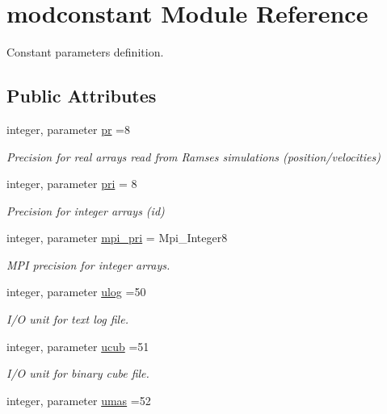 \hypertarget{classmodconstant}{\section{modconstant Module Reference}
\label{classmodconstant}
}


Constant parameters definition.  


\subsection*{Public Attributes}
\begin{DoxyCompactItemize}
\item 
integer, parameter \hyperlink{classmodconstant_a54966a555666da051c8c851545e11ff7}{pr} =8
\begin{DoxyCompactList}\small\item\em Precision for real arrays read from Ramses simulations (position/velocities) \end{DoxyCompactList}\item 
integer, parameter \hyperlink{classmodconstant_a3463d55217ae4b194f21c061a619c48e}{pri} = 8
\begin{DoxyCompactList}\small\item\em Precision for integer arrays (id) \end{DoxyCompactList}\item 
integer, parameter \hyperlink{classmodconstant_a4c7b1b69a38bfb69c932e4a770dae783}{mpi\-\_\-pri} = Mpi\-\_\-\-Integer8
\begin{DoxyCompactList}\small\item\em M\-P\-I precision for integer arrays. \end{DoxyCompactList}\item 
integer, parameter \hyperlink{classmodconstant_a6921eef21b749faf744304003fa3ac63}{ulog} =50
\begin{DoxyCompactList}\small\item\em I/\-O unit for text log file. \end{DoxyCompactList}\item 
integer, parameter \hyperlink{classmodconstant_acb8d6ab8e571b34dcb11638e425e57db}{ucub} =51
\begin{DoxyCompactList}\small\item\em I/\-O unit for binary cube file. \end{DoxyCompactList}\item 
integer, parameter \hyperlink{classmodconstant_a542f50ea5e4225b1340cbcbca9eb30ee}{umas} =52

\end{DoxyCompactItemize}
